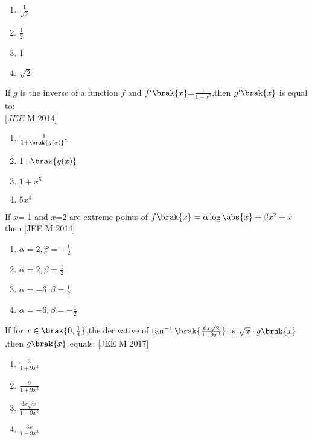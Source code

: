 \begin{multicols}{2}
    

     \begin{enumerate}
     \item $\frac{1}{\sqrt{2}}$
     \item $\frac{1}{2}$
     \item 1
     \item $\sqrt{2}$
     \end{enumerate}
     \end{multicols}
      \item If $g$ is the inverse of a function $f$ and $f^{\prime}\brak{x}$=$\frac{1}{1+x^5}$,then $g^{\prime}\brak{x}$ is equal to:\\    
      \hfill[$JEE$ M 2014]
      \begin{multicols}{2}
          
      
      \begin{enumerate}
      \item $\frac{1}{1+\brak{{g(x)}}^5}$
      \item 1+$\brak{{g(x)}}$
      \item $1+x^5$
      \item $5x^4$
      \end{enumerate}
      \end{multicols}
      \item If $x$=-1 and $x$=2 are extreme points of $f\brak{x}=\alpha\log\abs{x}+\beta x^2+x$ then 
	      \hfill[JEE M 2014]
       \begin{multicols}{2}
           
       
	      \begin{enumerate}
		      \item $\alpha=2,\beta=-\frac{1}{2}$
		      \item $\alpha=2,\beta=\frac{1}{2}$
		      \item $\alpha=-6,\beta=\frac{1}{2}$
		      \item $\alpha=-6,\beta=-\frac{1}{2}$
	      \end{enumerate}
       \end{multicols}
      \item If for $x\in\brak{0,\frac{1}{4}}$,the derivative of $\tan^{-1}\brak{\frac{6x\sqrt{2}}{1-9x^3}}$ is $\sqrt{x}\cdot g\brak{x}$,then $g\brak{x}$ equals:
	      \hfill[JEE M 2017]
       \begin{multicols}{2}
           
    
	      \begin{enumerate}
		      \item $\frac{3}{1+9x^3}$
		      \item $\frac{9}{1+9x^3}$
		      \item $\frac{3x\sqrt{x}}{1-9x^3}$
		      \item $\frac{3x}{1-9x^3}$
        
	      \end{enumerate}
       \end{multicols}

    
